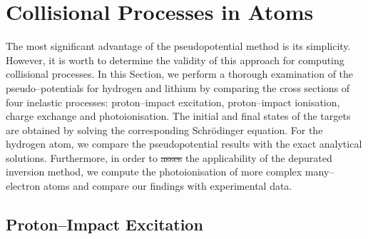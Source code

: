 \documentclass[10pt]{article}
\providecommand{\DIFaddtex}[1]{{\protect\color{blue}\uwave{#1}}} %
\providecommand{\DIFdeltex}[1]{{\protect\color{red}\sout{#1}}}                      %
\providecommand{\DIFaddbegin}{} %
\providecommand{\DIFaddend}{} %
\providecommand{\DIFdelbegin}{} %
\providecommand{\DIFdelend}{} %
\providecommand{\DIFadd}[1]{\texorpdfstring{\DIFaddtex{#1}}{#1}} %
\providecommand{\DIFdel}[1]{\texorpdfstring{\DIFdeltex{#1}}{}} %
\begin{document}
\section{Collisional Processes in Atoms}
\label{sec:colproc}

The most significant advantage of the pseudopotential method is its 
simplicity. However, it is worth to determine the validity of this 
approach \DIFaddbegin \DIFadd{when used }\DIFaddend for computing collisional processes. In this 
Section, we perform a thorough examination of the pseudo--potentials 
for hydrogen and lithium by comparing the cross sections of four 
inelastic processes: proton--impact excitation, proton--impact 
ionisation, charge exchange and photoionisation. The initial and 
final states of the targets are obtained by solving the corresponding 
Schr\"odinger equation. For the hydrogen atom, we compare the 
pseudopotential results with the exact analytical solutions. 
Furthermore, in order to \DIFdelbegin \DIFdel{asses }\DIFdelend \DIFaddbegin \DIFadd{assess }\DIFaddend the applicability of the depurated 
inversion method, we compute the photoionisation of more complex 
many--electron atoms and compare our findings with experimental data.


\subsection{Proton--Impact Excitation}
\end{document}
